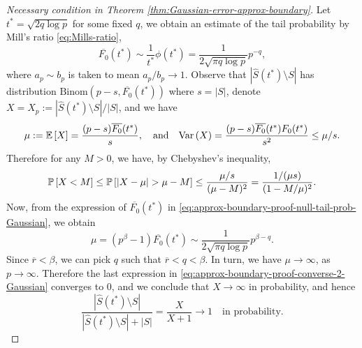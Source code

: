 \begin{proof}[Necessary condition in Theorem \ref{thm:Gaussian-error-approx-boundary}]
Let $t^* = \sqrt{2q\log{p}}$ for some fixed $q$, we obtain an estimate of the tail probability by Mill's ratio \eqref{eq:Mills-ratio}, 
\begin{equation}
    \overline{F_0}(t^*) 
    \sim \frac{1}{t^*}\phi(t^*)
    = \frac{1}{2\sqrt{\pi q\log{p}}} p^{-q}, \label{eq:approx-boundary-proof-null-tail-prob-Gaussian}
\end{equation}
where $a_p\sim b_p$ is taken to mean $a_p/b_p\to 1$.
Observe that $|\widehat{S}(t^*)\setminus{S}|$ has distribution $\text{Binom}(p-s, \overline{F_0}(t^*))$ where $s=|S|$, denote $X = X_p := {|\widehat{S}(t^*)\setminus{S}|}/{|S|}$, and we have 
$$
\mu := \E\left[X\right] = \frac{(p-s)\overline{F_0}(t^*)}{s},
\quad \text{and} \quad
\var\left(X\right) = \frac{(p-s)\overline{F_0}(t^*){F_0}(t^*)}{s^2} \le \mu/s.
$$
Therefore for any $M>0$, we have, by Chebyshev's inequality,
\begin{equation}
    \P\left[X < M\right] 
    \le \P\left[\left|X-\mu\right| > \mu - M\right]
    \le \frac{\mu/s}{(\mu-M)^2}
    = \frac{1/(\mu s)}{(1-M/\mu)^2}. \label{eq:approx-boundary-proof-converse-2-Gaussian}
\end{equation}
Now, from the expression of $\overline{F_0}(t^*)$ in \eqref{eq:approx-boundary-proof-null-tail-prob-Gaussian}, we obtain
$$
\mu = (p^\beta - 1)\overline{F_0}(t^*) \sim \frac{1}{2\sqrt{\pi q\log{p}}} p^{\beta-q}.
$$
Since $\overline{r}<\beta$, we can pick $q$ such that $\overline{r}<q<\beta$. 
In turn, we have $\mu \to\infty$, as $p\to\infty$.
Therefore the last expression in \eqref{eq:approx-boundary-proof-converse-2-Gaussian} converges to 0, and we conclude that $X\to\infty$ in probability, and hence
\begin{equation} \label{eq:approx-boundary-proof-converse-3-Gaussian}
\frac{|\widehat{S}(t^*)\setminus{S}|}{|\widehat{S}(t^*)\setminus{S}|+|{S}|} 
= \frac{X}{X+1} \to 1 \quad \text{in probability}.
\end{equation}


\end{proof}
